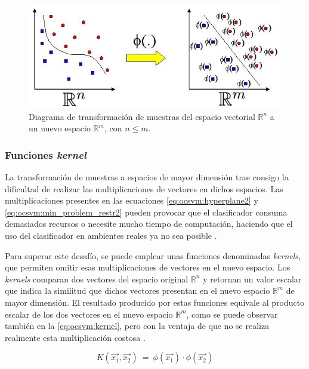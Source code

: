 \begin{figure}[ht]
    \centering
    \includegraphics[width=0.4\linewidth]{images/svm-transform-space.jpg}

    \caption{Diagrama de transformación de muestras del espacio vectorial
        $\mathbb{R}^{n}$ a un nuevo espacio $\mathbb{R}^{m}$, con $n \leq m$.}
    \label{fig:ocsvm:svm_transformed_space}
\end{figure}


\subsubsection{Funciones \textit{kernel}}

La transformación de muestras a espacios de mayor dimensión trae consigo
la dificultad de realizar las multiplicaciones de vectores en dichos
espacios. Las multiplicaciones presentes en las ecuaciones
\ref{eq:ocsvm:hyperplane2} y \ref{eq:ocsvm:min_problem_restr2} pueden
provocar que el clasificador consuma demasiados recursos o necesite mucho
tiempo de computación, haciendo que el uso del clasificador en ambientes
reales ya no sea posible
\citep{rieck2009machine}. %

Para superar este desafío, se puede emplear unas funciones denominadas
\textit{kernels}, que permiten omitir esas multiplicaciones de vectores
en el nuevo espacio. Los \textit{kernels} comparan dos vectores del
espacio original $\mathbb{R}^{n}$ y retornan un valor escalar que indica
la similitud que dichos vectores presentan en el nuevo espacio
$\mathbb{R}^{m}$ de mayor dimensión.
El resultado producido por estas funciones equivale al producto escalar
de los dos vectores en el nuevo espacio $\mathbb{R}^{m}$, como se
puede observar también en la \autoref{eq:ocsvm:kernel}, pero con la
ventaja de que no se realiza realmente esta multiplicación costosa
\citep{rieck2009machine}. %

\begin{equation}
    \label{eq:ocsvm:kernel}
    K(\vec{x_{1}}, \vec{x_{2}})
    \ = \
    \phi(\vec{x_{1}}) \cdot \phi(\vec{x_{2}})
\end{equation}

